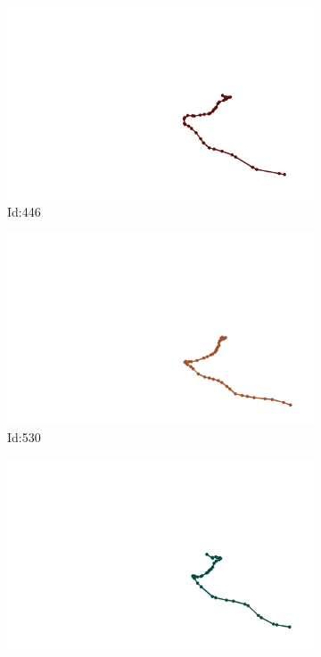 \documentclass[12pt,twoside]{report}
\begin{document}
\begin{figure}
\centering
\begin{subfigure}[b]{0.20\textwidth}
\centering
\includegraphics[width=\textwidth]{../../trajectories/446.png}
\caption{Id:446}
\end{subfigure}
\begin{subfigure}[b]{0.20\textwidth}
\centering
\includegraphics[width=\textwidth]{../../trajectories/530.png}
\caption{Id:530}
\end{subfigure}
\begin{subfigure}[b]{0.20\textwidth}
\centering
\includegraphics[width=\textwidth]{../../trajectories/615.png}

\end{subfigure}
\end{figure}
\end{document}

